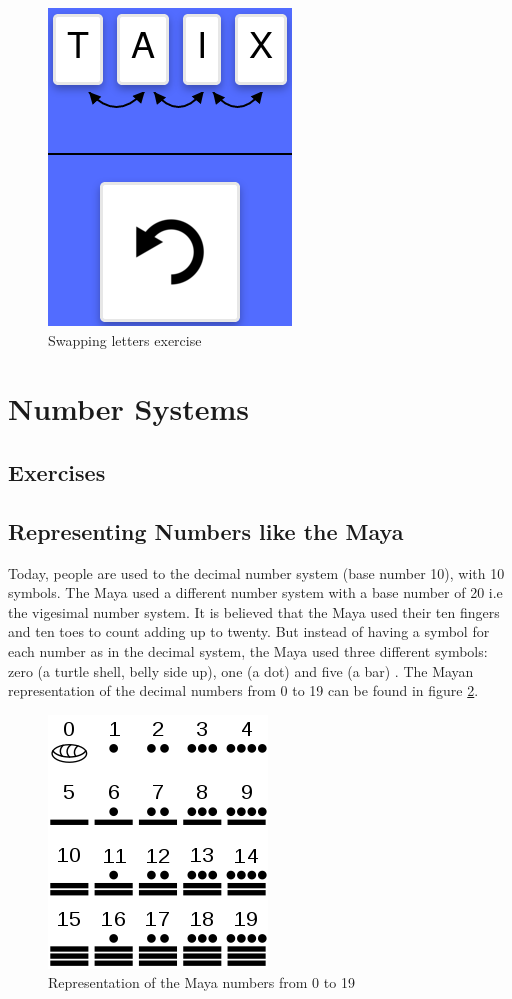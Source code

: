 \begin{figure} 
  \centering
  \includegraphics[width=0.2 \columnwidth]{figures/words_swap.png}
  \caption{Swapping letters exercise} 
  \label{fig:swappingLetters} 
\end{figure}

\section{Number Systems}
\label{section:numberSystems}

\subsection{Exercises}
\subsection*{Representing Numbers like the Maya}

Today, people are used to the decimal number system (base number 10), with 10 symbols. The Maya used a different number system with a base number of 20 i.e the vigesimal number system. It is believed that the Maya used their ten fingers and ten toes to count adding up to twenty. But instead of having a symbol for each number as in the decimal system, the Maya used three different symbols: zero (a turtle shell, belly side up), one (a dot) and five (a bar) \cite{Maya}. The Mayan representation of the decimal numbers from 0 to 19 can be found in figure \ref{fig:maya_numerals}.

\begin{figure} 
    \centering
    \includegraphics[width=0.3 \columnwidth]{figures/maya_number_system.png}
    \caption{Representation of the Maya numbers from 0 to 19} 
    \label{fig:maya_numerals} 
\end{figure}

